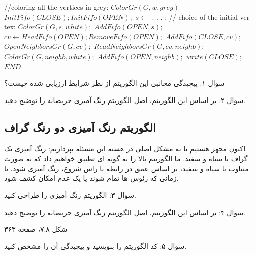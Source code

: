\documentclass{book} %
\begin{document}
\begin{latin}
    
    \begin{algorithm}
        \caption{}\label{your_label}
        \begin{algorithmic}
            \STATE //coloring all the vertices in grey:
                \STATE $ColorGr(G, w, grey)$
            \ENDFOR
            \STATE $InitFifo(CLOSE); InitFifo(OPEN);$
            \STATE $s \leftarrow$ . . . ; // choice of the initial vertex:
            \STATE $ColorGr(G, s, white);$
            \STATE $AddFifo(OPEN, s);$
                \STATE $cv \leftarrow HeadFifo(OPEN); RemoveFifo(OPEN);$
                \STATE $AddFifo(CLOSE, cv);$
                \STATE $OpenNeighborsGr(G, cv);$
                    \STATE $ReadNeighborsGr(G, cv, neighb);$
                        \STATE $ColorGr(G, neighb, white);$
                        \STATE $AddFifo(OPEN, neighb);$
                    \ENDIF
                \ENDWHILE
            \ENDWHILE
            \STATE $write(CLOSE);$
            \STATE $END$
        \end{algorithmic}
    \end{algorithm}
        
\end{latin}

سوال ۱: پیچیدگی مجانبی این الگوریتم از نظر شرایط ارزیابی شده چیست؟

سوال ۲: بر اساس این الگوریتم، اصل الگوریتم رنگ آمیزی حریصانه را توضیح دهید.

\subsection*{الگوریتم رنگ آمیزی دو رنگ گراف}

اکنون مجهز هستیم تا به مشکل اصلی در هسته این مسئله بپردازیم: رنگ آمیزی یک گراف با سیاه و سفید. ما الگوریتم بالا را به گونه ای تطبیق خواهیم داد که به صورت متناوب با سیاه و سفید، بر اساس عمق در رابطه با راس شروع، رنگ آمیزی شود، تا زمانی که رئوس ها تمام شوند یا یک عدم امکان کشف شود.

سوال ۳: الگوریتم رنگ آمیزی را طراحی کنید.

سوال ۴: بر اساس این الگوریتم، اصل الگوریتم رنگ آمیزی حریصانه را توضیح دهید.

شکل ۷.۸، صفحه ۳۶۳

سوال ۵: کد الگوریتم را بنویسید و پیچیدگی آن را مشخص کنید.
\end{document}
